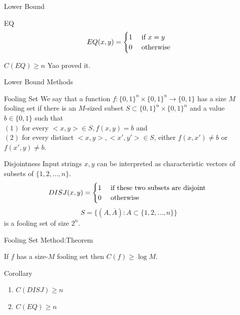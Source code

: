 \documentclass[9pt]{beamer}
\begin{document}
\begin{frame}{Lower Bound}
  \begin{block}{EQ}
    \[
    EQ(x,y) =
    \begin{cases} 
      \hfill 1    \hfill & \text{ if $x=y$} \\
      \hfill 0 \hfill & \text{ otherwise} \\
    \end{cases}
    \]
  \end{block}
  \pause 
  \begin{block}{$C(EQ)\geq n$}
    Yao proved it.
  \end{block}
\end{frame}

\begin{frame}{Lower Bound Methods}
  \pause
  \begin{block}{Fooling Set}
    We say that a function $f:\{0,1\}^n\times \{0,1\}^n\to\{0,1\}$ has a size $M$ 
    fooling set if
    there is an $M$-sized subset $S\subset\{0,1\}^n\times \{0,1\}^n$ and a value 
    $b\in\{0,1\}$
    such that \\
    \pause
    $(1)$ for every $<x,y>\in S,f(x,y)=b$ and \\
    \pause
    $(2)$ for every distinct 
    $<x,y>,<x',y'>\in S$, either $f(x,x')\neq b$ or $f(x',y)\neq b$.
  \end{block}
  \pause
  \begin{block}{Disjointness}
    Input strings $x,y$ can be interpreted as characteristic vectors of subsets of
    $\{1,2,...,n\}$. \\
   \[
    DISJ(x,y) =
    \begin{cases} 
      \hfill 1    \hfill & \text{ if these two subsets are disjoint } \\
      \hfill 0 \hfill & \text{ otherwise} \\
    \end{cases}
    \]
    \pause
    $$S=\bigg\{(A,\overline{A}):A\subset \{1,2,...,n\}\bigg\}$$ is a fooling set of 
    size $2^n$.
  \end{block}
\end{frame}
\begin{frame}{Fooling Set Method:Theorem}
  \begin{theorem}
    If $f$ has a size-$M$ fooling set then $C(f)\geq \log M$. 
  \end{theorem}
  \pause
  \begin{block}{Corollary}
    \begin{enumerate}[1)]
    \item $C(DISJ)\geq n$
    \item $C(EQ)\geq n$
    \end{enumerate}
  \end{block}
\end{frame}
\end{document}
